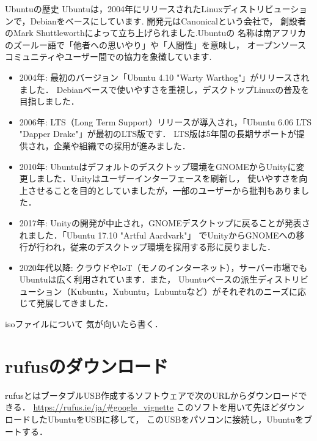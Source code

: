\documentclass[dvipdfmx,a4paper,11pt]{jsbook}
\begin{document}
\begin{subbox}{Ubuntuの歴史}
  Ubuntuは，2004年にリリースされたLinuxディストリビューションで，Debianをベースにしています.
  開発元はCanonicalという会社で，
  創設者のMark Shuttleworthによって立ち上げられました.Ubuntuの
  名称は南アフリカのズールー語で「他者への思いやり」や「人間性」を意味し，
  オープンソースコミュニティやユーザー間での協力を象徴しています.
  \begin{itemize}
    \item 2004年: 最初のバージョン「Ubuntu 4.10 "Warty Warthog"」がリリースされました．
    Debianベースで使いやすさを重視し，デスクトップLinuxの普及を目指しました．
    \item 2006年: LTS（Long Term Support）リリースが導入され，「Ubuntu 6.06 LTS "Dapper Drake"」が最初のLTS版です．
    LTS版は5年間の長期サポートが提供され，企業や組織での採用が進みました．
    \item 2010年: Ubuntuはデフォルトのデスクトップ環境をGNOMEからUnityに変更しました．Unityはユーザーインターフェースを刷新し，
    使いやすさを向上させることを目的としていましたが，一部のユーザーから批判もありました．
    \item 2017年: Unityの開発が中止され，GNOMEデスクトップに戻ることが発表されました．「Ubuntu 17.10 "Artful Aardvark"」
    でUnityからGNOMEへの移行が行われ，従来のデスクトップ環境を採用する形に戻りました．
    \item 2020年代以降: クラウドやIoT（モノのインターネット），サーバー市場でもUbuntuは広く利用されています．また，
    Ubuntuベースの派生ディストリビューション（Kubuntu，Xubuntu，Lubuntuなど）がそれぞれのニーズに応じて発展してきました．
  \end{itemize}
\end{subbox}

\begin{mainbox}{isoファイルについて}
  気が向いたら書く．
\end{mainbox}


\section{rufusのダウンロード}

rufusとはブータブルUSB作成するソフトウェアで次のURLからダウンロードできる．
\url{https://rufus.ie/ja/#google_vignette}
このソフトを用いて先ほどダウンロードしたUbuntuをUSBに移して，
このUSBをパソコンに接続し，Ubuntuをブートする．
\end{document}
